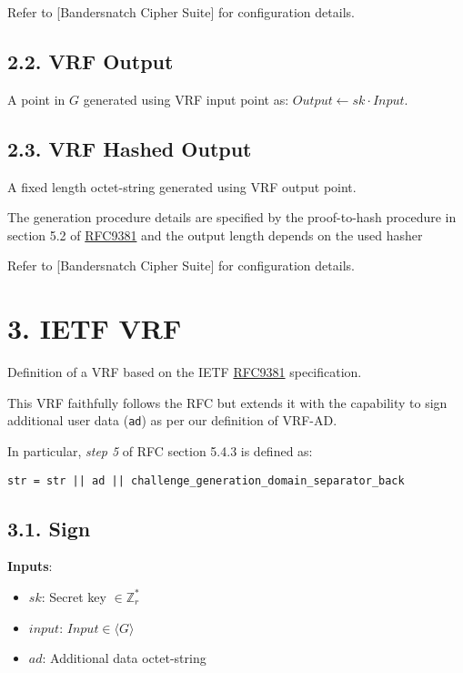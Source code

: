 \documentclass[
]{article}
\providecommand{\tightlist}{%
  \setlength{\itemsep}{0pt}\setlength{\parskip}{0pt}}
\begin{document}
Refer to {[}Bandersnatch Cipher Suite{]} for configuration details.

\hypertarget{vrf-output}{%
\subsection{2.2. VRF Output}\label{vrf-output}}

A point in \(G\) generated using VRF input point as:
\(Output \leftarrow sk \cdot Input\).

\hypertarget{vrf-hashed-output}{%
\subsection{2.3. VRF Hashed Output}\label{vrf-hashed-output}}

A fixed length octet-string generated using VRF output point.

The generation procedure details are specified by the proof-to-hash
procedure in section 5.2 of
\href{https://datatracker.ietf.org/doc/rfc9381/}{RFC9381} and the output
length depends on the used hasher

Refer to {[}Bandersnatch Cipher Suite{]} for configuration details.

\hypertarget{ietf-vrf}{%
\section{3. IETF VRF}\label{ietf-vrf}}

Definition of a VRF based on the IETF
\href{https://datatracker.ietf.org/doc/rfc9381/}{RFC9381} specification.

This VRF faithfully follows the RFC but extends it with the capability
to sign additional user data (\texttt{ad}) as per our definition of
VRF-AD.

In particular, \emph{step 5} of RFC section 5.4.3 is defined as:

\begin{verbatim}
str = str || ad || challenge_generation_domain_separator_back
\end{verbatim}

\hypertarget{sign}{%
\subsection{3.1. Sign}\label{sign}}

\textbf{Inputs}:

\begin{itemize}
\tightlist
\item
  \(sk\): Secret key \(\in \mathbb{Z}^*_r\)
\item
  \(input\): \(Input \in \langle G \rangle\)
\item
  \(ad\): Additional data octet-string
\end{itemize}
\end{document}
